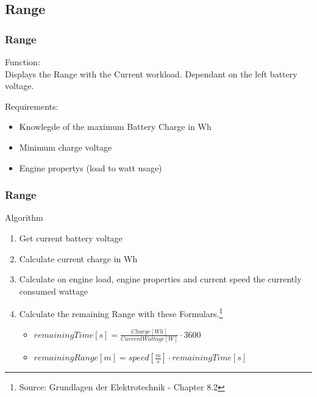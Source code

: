 \documentclass{beamer}
\begin{document}
\subsection{Range}
\begin{frame}
    \frametitle{Range}
    Function:\\
    Displays the Range with the Current workload. Dependant on the left battery voltage.

    Requirements:
    \begin{itemize}
        \item Knowlegde of the maximum Battery Charge in Wh
        \item Minimum charge voltage
        \item Engine propertys (load to watt usage)
    \end{itemize}
    

\end{frame}
\begin{frame}
    \frametitle{Range}
    Algorithm
    \begin{enumerate}
     \item Get current battery voltage
     \item Calculate current charge in Wh
     \item Calculate on engine load, engine properties and current speed the currently consumed wattage
     \item Calculate the remaining Range with these Formulars.\footnote{Source: Grundlagen der Elektrotechnik - Chapter 8.2}
     \begin{itemize}
        \item $remainingTime\left[ s \right]=\frac{Charge\left[ Wh \right]}{Current Wattage\left[ W \right]}\cdot3600$
        \item $remainingRange\left[ m \right]=speed\left[ \frac{m}{s} \right]\cdot remainingTime\left[ s \right]$
     \end{itemize}
    \end{enumerate}
\end{frame}
\end{document}
